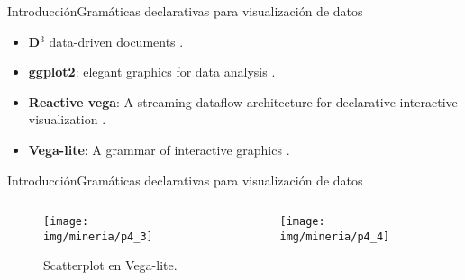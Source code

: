 \documentclass[10pt]{beamer}
\newcommand{\1}{
        	\setbeamertemplate{background}{
        		\texttt{[image: img/1]}
        		\tikz[overlay] \fill[fill opacity=0.75,fill=white] (0,0) rectangle (-\paperwidth,\paperheight);
        	}
}
\begin{document}
\begin{frame}{Introducción}{Gramáticas declarativas para visualización de datos}
	
	\begin{itemize}
		\item\textbf{D$^3$} data-driven documents \cite{bostock2011d3}.
		\item \textbf{ggplot2}: elegant graphics for data analysis \cite{wickham2016ggplot2}.
		\item \textbf{Reactive vega}: A streaming dataflow architecture for declarative interactive visualization \cite{satyanarayan2015reactive}.
		\item \textbf{Vega-lite}: A grammar of interactive graphics \cite{satyanarayan2016vega}.
		
	\end{itemize}
	
\end{frame}

\begin{frame}{Introducción}{Gramáticas declarativas para visualización de datos}
	\begin{columns}
		\begin{column}{0.48\textwidth}
			\begin{figure}[]
				\centering
				\texttt{[image: img/mineria/p4\_3]}
				\caption{Scatterplot en Vega-lite.}
			\end{figure}	
		\end{column}
		\begin{column}{0.48\textwidth}
					\begin{figure}[]
						\centering
						\texttt{[image: img/mineria/p4\_4]}
					\end{figure}	
		\end{column}
	\end{columns}
\end{frame}
\end{document}
